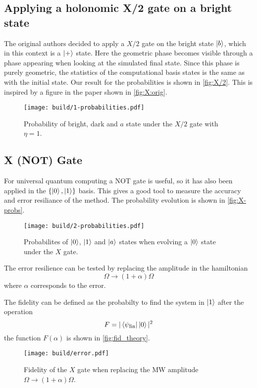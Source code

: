 \documentclass[%
reprint,
amsmath,amssymb,
aps,
]{revtex4-2}
\begin{document}
\subsection{Applying a holonomic X/2 gate on a bright state}
\label{sec:Applying a holonomic gate on a bright state}
The original authors decided to apply a $X/2$ gate on the bright state $\ket{b}$, which in this
context is a $\ket{+}$ state. Here the geometric phase becomes visible through a phase 
appearing when looking at the simulated final state. Since this phase is purely geometric, the
statistics of the computational basis states is the same as with the initial state. Our result for
the probabilities is shown in \autoref{fig:X/2}. This is inspired by a figure in the paper shown in 
\autoref{fig:X:orig}.
\begin{figure}
  \centering
  \texttt{[image: build/1-probabilities.pdf]}
  \caption{Probability of bright, dark and $a$ state under the $X/2$ gate with $\eta=1$.}
  \label{fig:X/2}
\end{figure}

\subsection{X (NOT) Gate}
\label{sec:X (NOT) Gate}
For universal quantum computing a NOT gate is useful, so it has also been applied in the $\{
\ket{0}, \ket{1} \}$ basis. This gives a good tool to measure the accuracy and error resiliance of
the method. The probability evolution is shown in \autoref{fig:X-probs}. 
\begin{figure}
  \centering
  \texttt{[image: build/2-probabilities.pdf]}
  \caption{Probabilites of $\ket{0}$, $\ket{1}$ and $\ket{a}$ states when evolving a $\ket{0}$
  state under the $X$ gate.}
  \label{fig:X-probs}
\end{figure}
The error resilience can be tested by replacing the amplitude in the hamiltonian 
\[
  \Omega \rightarrow (1 + \alpha) \Omega
\]
where $\alpha$ corresponds to the error.

The fidelity can be defined as the probabilty to find the system in $\ket{1}$ after the operation
\[
  F = 
  \vert
  \bra{\psi_\text{fin}}
  \ket{0}
  \vert^2
\]
the function $F(\alpha)$ is shown in \autoref{fig:fid_theory}.
\begin{figure}[H]
  \centering
  \texttt{[image: build/error.pdf]}
  \caption{Fidelity of the $X$ gate when replacing the MW amplitude $\Omega \rightarrow
  (1+\alpha)\Omega$.}
  \label{fig:fid_theory}
\end{figure}
\end{document}
